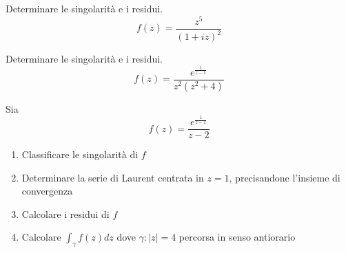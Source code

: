 Determinare le singolarità e i residui.
\begin{equation*}
f\left(z\right) = \frac{z^{5}}{\left(1 + iz\right)^{2}}
\end{equation*}
\Esercizio{}

Determinare le singolarità e i residui.
\begin{equation*}
f\left(z\right) = \frac{e^{\frac{1}{z - 1}}}{z^{2}\left(z^{2} + 4\right)}
\end{equation*}
\Esercizio{}

Sia
\begin{equation*}
f\left(z\right) = \frac{e^{\frac{1}{z - 1}}}{z - 2}
\end{equation*}
\begin{enumerate}
\item Classificare le singolarità di $f$
\item Determinare la serie di Laurent centrata in $z = 1$, precisandone l'insieme di convergenza
\item Calcolare i residui di $f$
\item Calcolare $\int _{\gamma } f\left(z\right) dz$ dove $\gamma :\left| z\right| = 4$ percorsa in senso antiorario
\end{enumerate}
\ParteSoluzioni
\Soluzione

